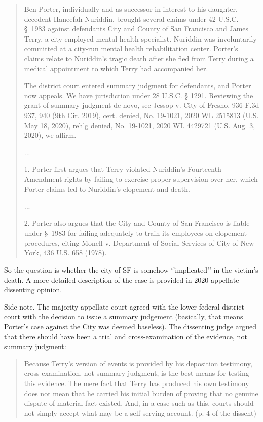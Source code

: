 \documentclass[
  10pt,
  dvipsnames,enabledeprecatedfontcommands]{scrartcl}
\begin{document}
\begin{quote}
Ben Porter, individually and as successor-in-interest to his daughter, decedent  Haneefah Nuriddin, brought several claims under 42 U.S.C. \S\ 1983 against defendants City and County of San Francisco and James Terry, a city-employed mental health specialist. Nuriddin was involuntarily committed at a city-run mental health rehabilitation center. Porter's claims relate to Nuriddin's tragic death after she fled from Terry during a medical appointment to which Terry had accompanied her. 

The district court entered summary judgment for defendants, and Porter now
appeals. We have jurisdiction under 28 U.S.C. § 1291. Reviewing the grant of
summary judgment de novo, see Jessop v. City of Fresno, 936 F.3d 937, 940 (9th
Cir. 2019), cert. denied, No. 19-1021, 2020 WL 2515813 (U.S. May 18, 2020), reh’g
denied, No. 19-1021, 2020 WL 4429721 (U.S. Aug. 3, 2020), we affirm.

...

1. Porter first argues that Terry violated Nuriddin's Fourteenth Amendment rights by failing to exercise proper supervision over her, which Porter claims led to Nuriddin's elopement and death. 

...

2. Porter also argues that the City and County of San Francisco is liable under \S\ 1983 for failing adequately to train its employees on elopement procedures, citing Monell v. Department of Social Services of City of New York, 436 U.S. 658 (1978). 
\end{quote}

So the question is whether the city of SF is somehow `'implicated'' in
the victim's death. A more detailed description of the case is provided
in 2020 appellate dissenting opinion.

Side note. The majority appellate court agreed with the lower federal
district court with the decision to issue a summary judgement
(basically, that means Porter's case against the City was deemed
baseless). The dissenting judge argued that there should have been a
trial and cross-examination of the evidence, not summary judgment:

\begin{quote}
Because Terry’s version of events is
provided by his deposition testimony, cross-examination, not summary judgment,
is the best means for testing this evidence. The mere fact that Terry has produced
his own testimony does not mean that he carried his initial burden of proving that
no genuine dispute of material fact existed. And, in a case such as this, courts
should not simply accept what may be a self-serving account. (p. 4 of the dissent)
\end{quote}
\end{document}
